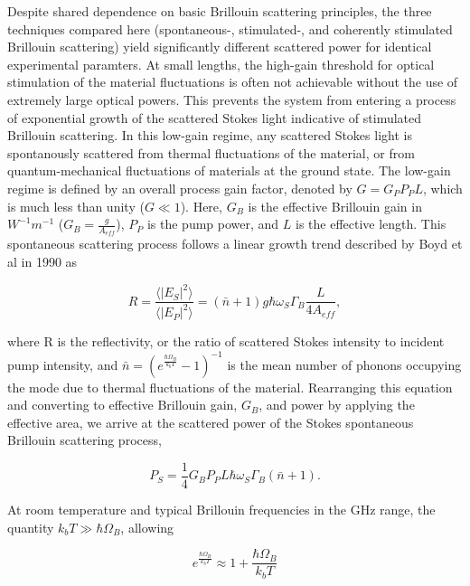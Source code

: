 Despite shared dependence on basic Brillouin scattering principles, the three techniques compared here (spontaneous-, stimulated-, and coherently stimulated Brillouin scattering) yield significantly different scattered power for identical experimental paramters. At small lengths, the high-gain threshold for optical stimulation of the material fluctuations is often not achievable without the use of extremely large optical powers. This prevents the system from entering a process of exponential growth of the scattered Stokes light indicative of stimulated Brillouin scattering.\cite{boyd2020nonlinear} In this low-gain regime, any scattered Stokes light is spontanously scattered from thermal fluctuations of the material, or from quantum-mechanical fluctuations of materials at the ground state. The low-gain regime is defined by an overall process gain factor, denoted by $G = G_{P}P_{P}L$, which is much less than unity ($G \ll 1$). Here, $G_{B}$ is the effective Brillouin gain in $W^{-1}m^{-1}$ ($G_{B} = \frac{g}{A_{eff}}$), $P_{P}$ is the pump power, and $L$ is the effective length. This spontaneous scattering process follows a linear growth trend described by Boyd et al in 1990\cite{boyd1990noise} as

\begin{equation}
  R = \frac{\langle|E_{S}|^{2}\rangle}{\langle|E_{P}|^{2}\rangle} = (\bar{n} + 1)g\hbar\omega_{S}\Gamma_{B}\frac{L}{4A_{eff}},
\end{equation}

where R is the reflectivity, or the ratio of scattered Stokes intensity to incident pump intensity, and $\bar{n} = (e^{\frac{\hbar\Omega_{B}}{k_{b}T}} - 1)^{-1}$ is the mean number of phonons occupying the mode due to thermal fluctuations of the material. Rearranging this equation and converting to effective Brillouin gain, $G_{B}$, and power by applying the effective area, we arrive at the scattered power of the Stokes spontaneous Brillouin scattering process,

\begin{equation}
  P_S = \frac{1}{4}G_{B}P_{P}L\hbar\omega_{S}\Gamma_{B}(\bar{n} + 1).
  \label{eq:SponBSnbar}
\end{equation}

At room temperature and typical Brillouin frequencies in the GHz range, the quantity $k_{b}T \gg \hbar\Omega_{B}$, allowing

\begin{equation}
e^{\frac{\hbar\Omega_{B}}{k_{b}T}} \approx 1 + \frac{\hbar\Omega_{B}}{k_{b}T}
\end{equation}

